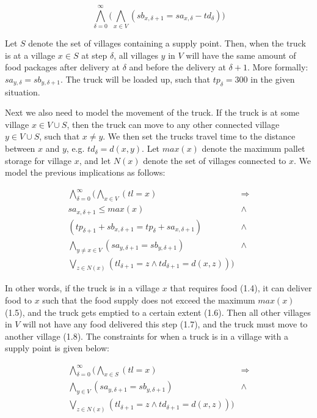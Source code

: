\begin{equation}
    \label{consumption}
    \bigwedge^{\infty}_{\delta=0}\bigg(\bigwedge_{x \in V} (sb_{x, \delta+1} = sa_{x, \delta} - td_{\delta})\bigg)
\end{equation}

Let $S$ denote the set of villages containing a supply point. Then, when the truck is at a village $x \in S$ at step $\delta$, all villages $y$ in $V$ will have the same amount of food packages after delivery at $\delta$ and before the delivery at $\delta + 1$. More formally: $sa_{y, \delta} = sb_{y, \delta+1}$. The truck will be loaded up, such that $tp_{\delta} = 300$ in the given situation. 

Next we also need to model the movement of the truck. If the truck is at some village $x \in V \cup S$, then the truck can move to any other connected village $y \in V \cup S$, such that $x \not= y$. We then set the trucks travel time to the distance between $x$ and $y$, e.g. $td_{\delta} = d(x,y)$. Let $max(x)$ denote the maximum pallet storage for village $x$, and let $N(x)$ denote the set of villages connected to $x$. We model the previous implications as follows:

\begin{align}
    \label{citystop}
    \bigwedge^{\infty}_{\delta=0}\bigg(\bigwedge_{x \in V} (tl = x) & \Rightarrow \\ 
    sa_{x,\delta+1} \leq max(x) & \wedge \\ 
    (tp_{\delta+1} + sb_{x, \delta+1} = tp_{\delta} + sa_{x, \delta+1}) & \wedge \\ 
    \bigwedge_{y\not=x \in V}(sa_{y, \delta+1} = sb_{y, \delta+1}) & \wedge \\
    \bigvee_{z \in N(x)} (tl_{\delta+1} = z \wedge td_{\delta+1} = d(x,z))
    \bigg)
\end{align}

In other words, if the truck is in a village $x$ that requires food (1.4), it can deliver food to $x$ such that the food supply does not exceed the maximum $max(x)$ (1.5), and the truck gets emptied to a certain extent (1.6). Then all other villages in $V$ will not have any food delivered this step (1.7), and the truck must move to another village (1.8).
The constraints for when a truck is in a village with a supply point is given below:

\begin{align}
    \label{citystop}
    \bigwedge^{\infty}_{\delta=0}\bigg(\bigwedge_{x \in S} (tl = x) & \Rightarrow \\
    \bigwedge_{y \in V}(sa_{y, \delta+1} = sb_{y, \delta+1}) & \wedge \\
    \bigvee_{z \in N(x)} (tl_{\delta+1} = z \wedge td_{\delta+1} = d(x,z))
    \bigg)
\end{align}

